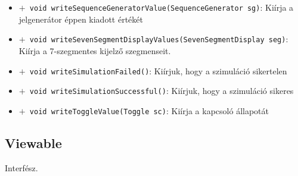 \begin{itemize}
\begin{itemize}
	\item[] \texttt{$+$ void writeSequenceGeneratorValue(SequenceGenerator sg)}: Kiírja a jelgenerátor éppen kiadott értékét
	\item[] \texttt{$+$ void writeSevenSegmentDisplayValues(SevenSegmentDisplay seg)}: Kiírja a 7-szegmentes kijelző szegmenseit.
	\item[] \texttt{$+$ void writeSimulationFailed()}: Kiírjuk, hogy a szimuláció sikertelen
	\item[] \texttt{$+$ void writeSimulationSuccessful()}: Kiírjuk, hogy a szimuláció sikeres
	\item[] \texttt{$+$ void writeToggleValue(Toggle sc)}: Kiírja a kapcsoló állapotát
\end{itemize}
\end{itemize}

\subsection{Viewable}
Interfész.
